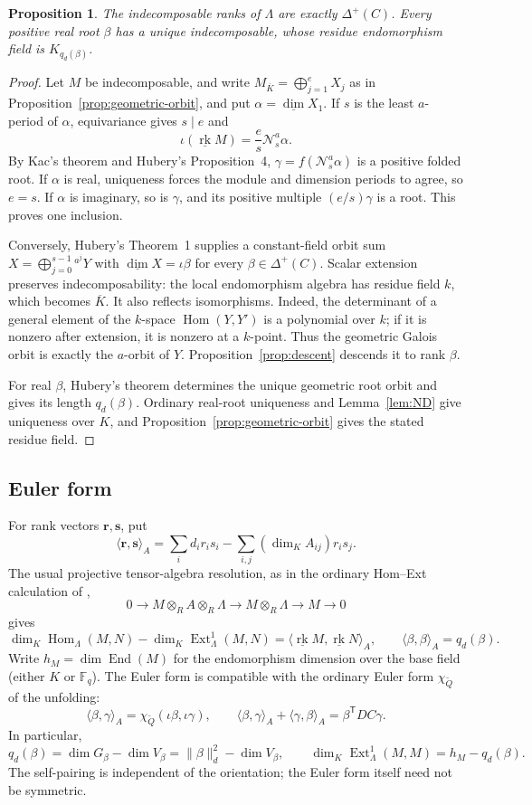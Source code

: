 \documentclass[11pt, reqno]{amsart}
\numberwithin{equation}{section}
\newtheorem{proposition}[theorem]{Proposition}
\theoremstyle{definition}
\theoremstyle{remark}
\newcommand{\op}[1]{\operatorname{#1}}
\newcommand{\mb}[1]{\mathbb{#1}}
\newcommand{\mc}[1]{\mathcal{#1}}
\newcommand{\rk}{\underline{\op{rk}}}
\newcommand{\dimv}{\underline{\dim}}
\newcommand{\End}{\op{End}}
\newcommand{\Hom}{\op{Hom}}
\newcommand{\Ext}{\op{Ext}}
\newcommand{\Qbar}{\widetilde Q}
\newcommand{\Kbar}{\overline K}
\begin{document}
\begin{proposition}\label{prop:root}
The indecomposable ranks of $\Lambda$ are exactly $\Delta^+(C)$.
Every positive real root $\beta$ has a unique indecomposable, whose
residue endomorphism field is $K_{q_d(\beta)}$.
\end{proposition}
\begin{proof}
Let $M$ be indecomposable, and write
$M_{\Kbar}=\bigoplus_{j=1}^e X_j$ as in
Proposition~\ref{prop:geometric-orbit}, and put $\alpha=\dimv X_1$. If $s$ is the least
$a$-period of $\alpha$, equivariance gives $s\mid e$ and
\[ \iota(\rk M)=\frac es\mc N_s^a\alpha. \]
By Kac's theorem and Hubery's Proposition~4,
$\gamma=f(\mc N_s^a\alpha)$ is a positive folded root. If
$\alpha$ is real, uniqueness forces the module and dimension periods
to agree, so $e=s$. If $\alpha$ is imaginary, so is $\gamma$, and its
positive multiple $(e/s)\gamma$ is a root. This proves one inclusion.

Conversely, Hubery's Theorem~1 supplies a constant-field orbit sum
$X=\bigoplus_{j=0}^{s-1}{}^{a^j}Y$ with $\dimv X=\iota\beta$ for every
$\beta\in\Delta^+(C)$. Scalar extension preserves indecomposability:
the local endomorphism algebra has residue field $k$, which becomes
$\Kbar$. It also reflects isomorphisms. Indeed, the determinant of a
general element of the $k$-space $\Hom(Y,Y')$ is a polynomial over
$k$; if it is nonzero after extension, it is nonzero at a $k$-point.
Thus the geometric Galois orbit is exactly the $a$-orbit of $Y$.
Proposition~\ref{prop:descent} descends it to rank $\beta$.

For real $\beta$, Hubery's theorem determines the unique geometric
root orbit and gives its length $q_d(\beta)$. Ordinary real-root
uniqueness and Lemma~\ref{lem:ND} give uniqueness over $K$, and
Proposition~\ref{prop:geometric-orbit} gives the stated residue field.
\end{proof}

\subsection{Euler form}
For rank vectors $\mathbf r,\mathbf s$, put
\[ \langle\mathbf r,\mathbf s\rangle_A =\sum_i d_i r_i s_i-\sum_{i,j}(\dim_K A_{ij})r_i s_j. \]
The usual projective tensor-algebra resolution, as in the ordinary
Hom--Ext calculation of \cite[Chapter~2]{DWbook},
\[ 0\longrightarrow M\otimes_R A\otimes_R\Lambda \longrightarrow M\otimes_R\Lambda\longrightarrow M\longrightarrow0 \]
gives
\[ \dim_K\Hom_\Lambda(M,N)-\dim_K\Ext^1_\Lambda(M,N) =\langle\rk M,\rk N\rangle_A, \qquad \langle\beta,\beta\rangle_A=q_d(\beta). \]
Write $h_M=\dim\End(M)$ for the endomorphism dimension over
the base field (either $K$ or $\mb F_q$). The Euler form is compatible
with the ordinary Euler form $\chi_{\Qbar}$ of the unfolding:
\[
\langle\beta,\gamma\rangle_A
=\chi_{\Qbar}(\iota\beta,\iota\gamma),\qquad
\langle\beta,\gamma\rangle_A+\langle\gamma,\beta\rangle_A
=\beta^{\mathsf T}DC\gamma.
\]
In particular,
\[
q_d(\beta)=\dim G_\beta-\dim V_\beta
=\lVert\beta\rVert_d^2-\dim V_\beta,\qquad
\dim_K\Ext^1_\Lambda(M,M)=h_M-q_d(\beta).
\]
The self-pairing is independent of the orientation; the Euler
form itself need not be symmetric.
\end{document}
